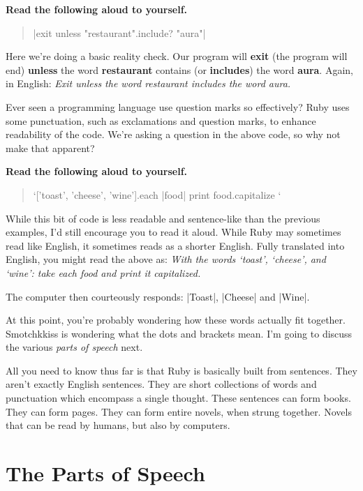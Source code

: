 \documentclass[12pt,twoside]{report}
\begin{document}
{\bf Read the following aloud to yourself.}

\begin{quote}
\rubyinline|exit unless "restaurant".include? "aura"|\end{quote}


Here we're doing a basic reality check.  Our program will {\bf exit}
(the program will end) {\bf unless} the word {\bf restaurant} contains
(or {\bf includes}) the word {\bf aura}.  Again, in English: {\em Exit
  unless the word restaurant includes the word aura.}

Ever seen a programming language use question marks so effectively?
Ruby uses some punctuation, such as exclamations and question marks,
to enhance readability of the code.  We're asking a question in the
above code, so why not make that apparent?

{\bf Read the following aloud to yourself.}

\begin{quote}
\rubyinline`['toast', 'cheese', 'wine'].each { |food|  print food.capitalize }`\end{quote}

While this bit of code is less readable and sentence-like than the
previous examples, I'd still encourage you to read it aloud.  While
Ruby may sometimes read like English, it sometimes reads as a shorter
English.  Fully translated into English, you might read the above as:
{\em With the words `toast', `cheese', and `wine': take each food and
  print it capitalized.}

The computer then courteously responds:
\rubyinline|Toast|,
\rubyinline|Cheese| and
\rubyinline|Wine|.

At this point, you're probably wondering how these words actually fit
together.  Smotchkkiss is wondering what the dots and brackets mean.
I'm going to discuss the various {\em parts of speech} next.

All you need to know thus far is that Ruby is basically built from
sentences.  They aren't exactly English sentences.  They are short
collections of words and punctuation which encompass a single thought.
These sentences can form books.  They can form pages.  They can form
entire novels, when strung together. Novels that can be read by
humans, but also by computers.



\section{The Parts of Speech}
\end{document}
